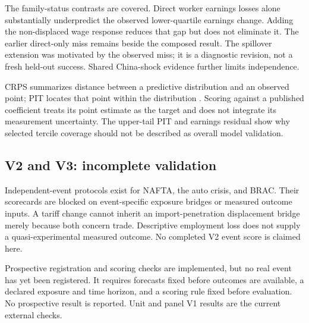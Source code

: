 \documentclass[10pt]{article}
\begin{document}


The family-status contrasts are covered. Direct worker earnings losses
alone substantially underpredict the observed lower-quartile earnings
change. Adding the non-displaced wage response \cite{adh2013} reduces
that gap but does not eliminate it. The earlier direct-only miss remains
beside the composed result. The spillover extension was motivated by
the observed miss; it is a diagnostic revision, not a fresh held-out
success. Shared China-shock evidence further limits independence.


CRPS summarizes distance between a predictive distribution and an observed
point; PIT locates that point within the distribution
\cite{hersbach2000}. Scoring against a published coefficient treats its
point estimate as the target and does not integrate its measurement
uncertainty. The upper-tail PIT and earnings residual show why selected
tercile coverage should not be described as overall model validation.

\subsection{V2 and V3: incomplete validation}
Independent-event protocols exist for NAFTA, the auto crisis, and BRAC.
Their scorecards are blocked on event-specific exposure bridges or
measured outcome inputs. A tariff change cannot inherit an
import-penetration displacement bridge merely because both concern
trade. Descriptive employment loss does not supply a quasi-experimental
measured outcome. No completed V2 event score is claimed here.

Prospective registration and scoring checks are implemented, but no
real event has yet been registered. It requires forecasts fixed
before outcomes are available, a declared exposure and time horizon,
and a scoring rule fixed before evaluation. No prospective result is
reported. Unit and panel V1 results are the current external checks.

\end{document}
